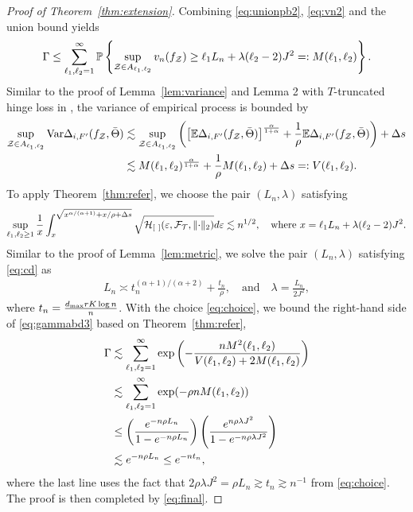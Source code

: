 \documentclass[11pt]{article}
\theoremstyle{plain}
\theoremstyle{definition}
\begin{document}
\begin{proof}[Proof of Theorem~\ref{thm:extension}]
Combining \eqref{eq:unionpb2},  \eqref{eq:vn2} and the union bound yields
\begin{align}\label{eq:gammabd3}
\Gamma\leq \sum_{\ell_1,\ell_2=1}^\infty\mathbb{P}\left\{\sup_{\mathcal{Z}\in A_{\ell_1,\ell_2}} v_n(f_{\mathcal{Z}})\geq  \ell_1 L_n+\lambda(\ell_2-2)J^2=:M(\ell_1,\ell_2) \right\}.
\end{align}
Similar to the proof of Lemma~\ref{lem:variance} and Lemma 2 with $T$-truncated hinge loss in \cite{lee2021nonparametric}, the variance of empirical process is bounded by 
\begin{align}
\sup_{\mathcal{Z}\in A_{\ell_1,\ell_2}}\textup{Var}\Delta_{i,F'}(f_{\mathcal{Z}},\bar \Theta)& \lesssim \sup_{\mathcal{Z}\in A_{\ell_1,\ell_2}}\left( \left[\mathbb{E}\Delta_{i,F'}(f_{\mathcal{Z}},\bar \Theta)\right]^{\alpha \over 1+\alpha}+{1\over \rho}\mathbb{E}\Delta_{i,F'}(f_{\mathcal{Z}},\bar \Theta)\right)+\Delta s \\&\lesssim M(\ell_1,\ell_2)^{\alpha\over 1+\alpha}+\frac{1}{\rho}M(\ell_1,\ell_2) +\Delta s =: V(\ell_1,\ell_2).
\end{align}
To apply Theorem~\ref{thm:refer}, we choose the pair $(L_n,\lambda)$ satisfying
\begin{align}\label{eq:cd}
\sup_{\ell_1,\ell_2\geq 1}{1\over x}\int_{x}^{\sqrt{x^{\alpha/(\alpha+1)}+x/\rho+\Delta s}}\sqrt{\tH_{[\ ]}(\varepsilon, \tF_{\tT},\vnormSize{}{\cdot})}d\varepsilon \lesssim n^{1/2}, \quad \text{where }x=\ell_1 L_n+\lambda(\ell_2-2)J^2.
\end{align}
Similar to the proof of Lemma~\ref{lem:metric}, we solve the pair $(L_n,\lambda)$ satisfying \eqref{eq:cd} as
\begin{align}\label{eq:choice}
L_n\asymp t_n^{(\alpha+1)/(\alpha+2)}+\frac{t_n}{\rho},\quad\text{and}\quad\lambda =  \frac{L_n}{2J^2},
\end{align}where $ t_n={d_{\max}rK\log n \over n}$.
With the choice \eqref{eq:choice}, we bound the right-hand side of \eqref{eq:gammabd3} based on Theorem~\ref{thm:refer}, 
\begin{align}\label{eq:gammabd4}
\Gamma&\lesssim \sum_{\ell_1,\ell_2=1}^\infty \exp\left(-\frac{nM^2(\ell_1,\ell_2)}{V(\ell_1,\ell_2)+2M(\ell_1,\ell_2)}\right)\\&\lesssim \sum_{\ell_1,\ell_2=1}^\infty	\exp(-\rho  n M(\ell_1,\ell_2))\\&\leq \left(e^{-n\rho L_n}\over 1-e^{-n\rho L_n}\right)\left(e^{n\rho \lambda J^2}\over 1-e^{-n\rho \lambda J^2}\right)\\&\lesssim e^{-n\rho L_n}\leq e^{-nt_n},
\end{align}
where the last line uses the fact that $2\rho\lambda J^2= \rho L_n\gtrsim t_n\gtrsim n^{-1}$ from \eqref{eq:choice}. The proof is then completed by \eqref{eq:final}.
\end{proof}
\end{document}
